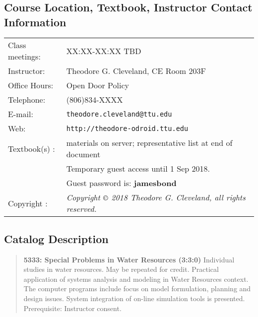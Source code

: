 \documentclass[12pt]{article}
\begin{document}
\section*{ }
\subsection*{{Course Location, Textbook, Instructor Contact Information}}
\begin{tabular}{p{1.5in}p{5.0in}}
Class meetings:  &    XX:XX-XX:XX TBD\\
Instructor: & Theodore G. Cleveland, CE Room 203F \\
Office Hours: & Open Door Policy \\
Telephone: & (806)834-XXXX \\
E-mail: & \texttt{theodore.cleveland@ttu.edu}\\
Web: & \texttt{http://theodore-odroid.ttu.edu} \\
Textbook(s) : &  materials on server; representative list at end of document\\
~ & Temporary guest access until 1 Sep 2018.  \\
~ & Guest password is: \textbf{jamesbond} \\ 
Copyright : & \textsl{Copyright $\copyright$ 2018 Theodore G. Cleveland, all rights reserved.} \\
\end{tabular}
\subsection*{{Catalog Description}}
\begin{quote} \textbf{5333: Special Problems in Water Resources (3:3:0)} 
 Individual studies in water resources. May be repeated for credit.
Practical application of systems analysis and modeling in Water Resources context. The computer programs include focus on model formulation, planning and design issues. 
System integration of on-line simulation tools is presented.
Prerequisite: Instructor consent. 
\end{quote}
\end{document}
